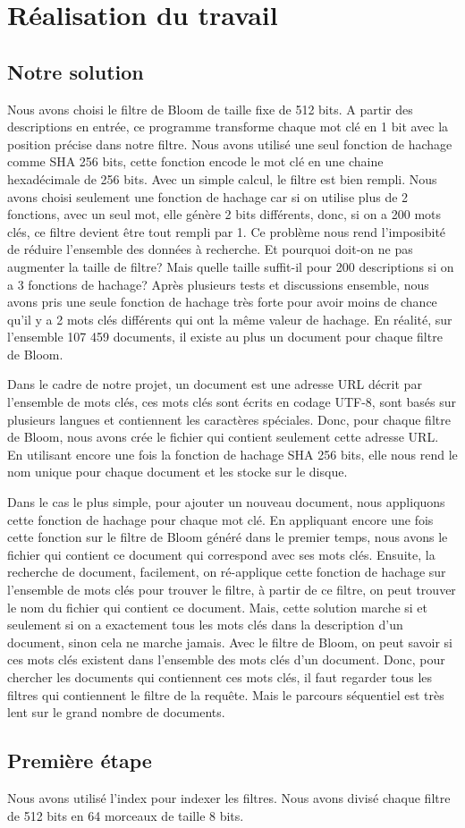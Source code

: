\chapter{Réalisation du travail}
\section{Notre solution}
	Nous avons choisi le filtre de Bloom de taille fixe de 512 bits. A partir des descriptions en entrée, ce programme transforme chaque mot clé en 1 bit avec la position précise dans notre filtre. Nous avons utilisé une seul fonction de hachage comme SHA 256 bits, cette fonction encode le mot clé en une chaine hexadécimale de 256 bits. Avec un simple calcul, le filtre est bien rempli. Nous avons choisi seulement une fonction de hachage car si on utilise plus de 2 fonctions, avec un seul mot, elle génère 2 bits différents, donc, si on a 200 mots clés, ce filtre devient être tout rempli par 1. Ce problème nous rend l'imposibité de réduire l'ensemble des données à recherche. Et pourquoi doit-on ne pas augmenter la taille de filtre? Mais quelle taille suffit-il pour 200 descriptions si on a 3 fonctions de hachage? Après plusieurs tests et discussions ensemble, nous avons pris une seule fonction de hachage très forte pour avoir moins de chance qu'il y a 2 mots clés différents qui ont la même valeur de hachage. En réalité, sur l'ensemble 107 459 documents, il existe au plus un document pour chaque filtre de Bloom.
	
	Dans le cadre de notre projet, un document est une adresse URL décrit par l'ensemble de mots clés, ces mots clés sont écrits en codage UTF-8, sont basés sur plusieurs langues et contiennent les caractères spéciales. Donc, pour chaque filtre de Bloom, nous avons crée le fichier qui contient seulement cette adresse URL. En utilisant encore une fois la fonction de hachage SHA 256 bits, elle nous rend le nom unique pour chaque document et les stocke sur le disque.
	
	Dans le cas le plus simple, pour ajouter un nouveau document, nous appliquons cette fonction de hachage pour chaque mot clé. En appliquant encore une fois cette fonction sur le filtre de Bloom généré dans le premier temps, nous avons le fichier qui contient ce document qui correspond avec ses mots clés. Ensuite, la recherche de document, facilement, on ré-applique cette fonction de hachage sur l'ensemble de mots clés pour trouver le filtre, à partir de ce filtre, on peut trouver le nom du fichier qui contient ce document. Mais, cette solution marche si et seulement si on a exactement tous les mots clés dans la description d'un document, sinon cela ne marche jamais. Avec le filtre de Bloom, on peut savoir si ces mots clés existent dans l'ensemble des mots clés d'un document. Donc, pour chercher les documents qui contiennent ces mots clés, il faut regarder tous les filtres qui contiennent le filtre de la requête. Mais le parcours séquentiel est très lent sur le grand nombre de documents. 
	
\section{Première étape}
	Nous avons utilisé l'index pour indexer les filtres. Nous avons divisé chaque filtre de 512 bits en 64 morceaux de taille 8 bits.
	
	







